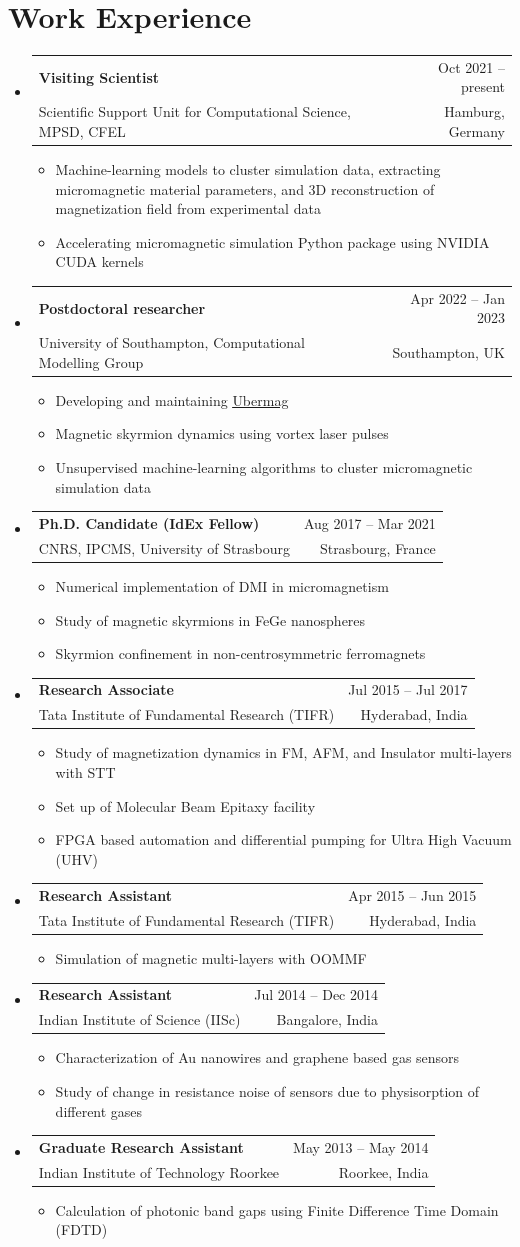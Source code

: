 \documentclass[A4,11pt]{article}
\makeatletter
\newcommand{\CVItem}[1]{
  \item\small{
    {#1 \vspace{-2pt}}
  }
}
\newcommand{\CVSubheading}[4]{
  \vspace{-2pt}\item
    \begin{tabular*}{0.97\textwidth}[t]{l@{\extracolsep{\fill}}r}
      \textbf{#1} & #2 \\
      \small#3 & \small #4 \\
    \end{tabular*}\vspace{-7pt}
}
\newcommand{\CVSubHeadingListStart}{\begin{itemize}[leftmargin=0.5cm, label={}]}
\newcommand{\CVSubHeadingListEnd}{\end{itemize}}
\newcommand{\CVItemListStart}{\begin{itemize}}
\newcommand{\CVItemListEnd}{\end{itemize}\vspace{-5pt}}
\makeatother
\begin{document}
\section{Work Experience}
  \CVSubHeadingListStart
    \CVSubheading
      {Visiting Scientist}{Oct 2021 -- present}
      {Scientific Support Unit for Computational Science, MPSD, CFEL}{Hamburg, Germany}
      \CVItemListStart
        \CVItem{Machine-learning models to cluster simulation data,
          extracting micromagnetic material parameters, and 3D reconstruction of
          magnetization field from experimental data}
        \CVItem{Accelerating micromagnetic simulation Python package using NVIDIA
          CUDA kernels}
      \CVItemListEnd
    \CVSubheading
      {Postdoctoral researcher}{Apr 2022 -- Jan 2023}
      {University of Southampton, Computational Modelling Group}{Southampton, UK}
      \CVItemListStart
      \CVItem{Developing and
        maintaining \href{https://ubermag.github.io/}{\color{blue} \underline{Ubermag}}}
        \CVItem{Magnetic skyrmion dynamics using vortex laser pulses}
        \CVItem{Unsupervised machine-learning algorithms to cluster micromagnetic simulation data}
      \CVItemListEnd
    \CVSubheading
    {Ph.D. Candidate (IdEx Fellow)}{Aug 2017 -- Mar 2021}
      {CNRS, IPCMS, University of Strasbourg}{Strasbourg, France}
      \CVItemListStart
        \CVItem{Numerical implementation of DMI in micromagnetism}
        \CVItem{Study of magnetic skyrmions in FeGe nanospheres}
        \CVItem{Skyrmion confinement in non-centrosymmetric ferromagnets}
      \CVItemListEnd
    \CVSubheading
    {Research Associate}{Jul 2015 -- Jul 2017}
     {Tata Institute of Fundamental Research (TIFR)}{Hyderabad, India}
      \CVItemListStart
        \CVItem{Study of magnetization dynamics in FM, AFM, and Insulator multi-layers with STT}
        \CVItem{Set up of Molecular Beam Epitaxy facility}
        \CVItem{FPGA based automation and differential pumping for Ultra High
          Vacuum (UHV)}
      \CVItemListEnd
    \CVSubheading
    {Research Assistant}{Apr 2015 -- Jun 2015}
     {Tata Institute of Fundamental Research (TIFR)}{Hyderabad, India}
      \CVItemListStart
        \CVItem{Simulation of magnetic multi-layers with OOMMF}
      \CVItemListEnd
    \CVSubheading
    {Research Assistant}{Jul 2014 -- Dec 2014}
     {Indian Institute of Science (IISc)}{Bangalore, India}
      \CVItemListStart
        \CVItem{Characterization of Au nanowires and graphene based gas sensors}
        \CVItem{Study of change in resistance noise of sensors due to physisorption of different gases}
      \CVItemListEnd
    \CVSubheading
    {Graduate Research Assistant}{May 2013 -- May 2014}
      {Indian Institute of Technology Roorkee}{Roorkee, India}
      \CVItemListStart
        \CVItem{Calculation of photonic band gaps using Finite Difference Time Domain (FDTD)}
      \CVItemListEnd
  \CVSubHeadingListEnd
\end{document}
